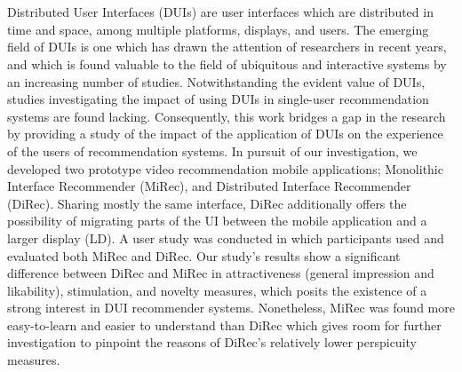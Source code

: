 \chapter{\abstractname}
Distributed User Interfaces (DUIs) are user
interfaces which are distributed in time and space, among multiple platforms, displays, and
users. The emerging field of DUIs is one which has drawn the attention of
researchers in recent years, and which is found valuable to the field of ubiquitous and
interactive systems by an increasing number of studies. Notwithstanding the
evident value of DUIs, studies investigating the impact of using DUIs in
single-user recommendation systems are found lacking. Consequently, this work
bridges a gap in the research by providing a study of the impact of the application of DUIs on the experience of the users of
recommendation systems. In pursuit of our investigation, we developed two
prototype video recommendation mobile applications; Monolithic Interface
Recommender (MiRec), and Distributed Interface Recommender (DiRec). Sharing
mostly the same interface, DiRec additionally offers
the possibility of migrating parts of the UI between the mobile application and
a larger display (LD).
A user study was conducted in which participants used and evaluated both MiRec
and DiRec. Our study's results
show a significant difference between DiRec and MiRec in attractiveness (general
impression and likability), stimulation, and novelty measures, which posits the
existence of a strong interest in DUI recommender systems. Nonetheless, MiRec
was found more easy-to-learn and easier to understand than DiRec
which gives room for further investigation to pinpoint the reasons of DiRec's
relatively lower perspicuity measures.

